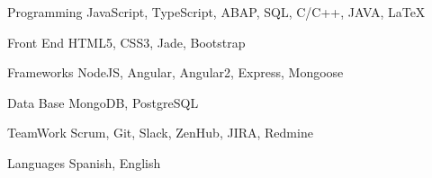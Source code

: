 


\begin{cvskills}


\cvskill
{Programming} %
{JavaScript, TypeScript, ABAP, SQL, C/C++, JAVA, \LaTeX{}} %

\cvskill
{Front End} %
{HTML5, CSS3, Jade, Bootstrap} %

\cvskill
{Frameworks} %
{NodeJS, Angular, Angular2, Express, Mongoose} %

\cvskill
{Data Base} %
{MongoDB, PostgreSQL} %

\cvskill
{TeamWork} %
{Scrum, Git, Slack, ZenHub, JIRA, Redmine} %

\cvskill
{Languages} %
{Spanish, English} %


\end{cvskills}

